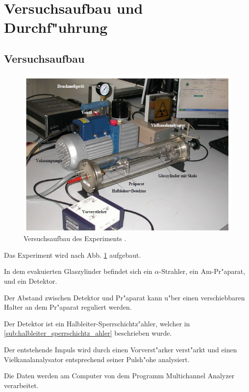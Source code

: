 \section{Versuchsaufbau und Durchf"uhrung} %
\label{sec:durchf_uhrung}
	
	\subsection{Versuchsaufbau} %
	\label{sub:versuchsaufbau}
	
	\begin{figure}[!h]
		\centering
		\includegraphics[width = 13cm]{img/Aufbau.JPG}
		\caption{Versuchsaufbau des Experiments \cite{anleitung}.}
		\label{fg:aufbau}
	\end{figure}

	Das Experiment wird nach Abb. \ref{fg:aufbau} aufgebaut.

	In dem evakuierten Glaszylinder befindet sich ein $\alpha$-Strahler, ein Am-Pr"aparat, und ein Detektor.

	Der Abstand zwischen Detektor und Pr"aparat kann u"ber einen verschiebbaren Halter an dem Pr"aparat reguliert werden.

	Der Detektor ist ein Halbleiter-Sperrschichtz"ahler, welcher in \ref{sub:halbleiter_sperrschichtz_ahler} beschrieben wurde.

	Der entstehende Impuls wird durch einen Vorverst"arker verst"arkt und einen Vielkanalanalysator entsprechend seiner Pulsh"ohe analysiert.

	Die Daten werden am Computer von dem Programm Multichannel 
	Analyzer verarbeitet.

